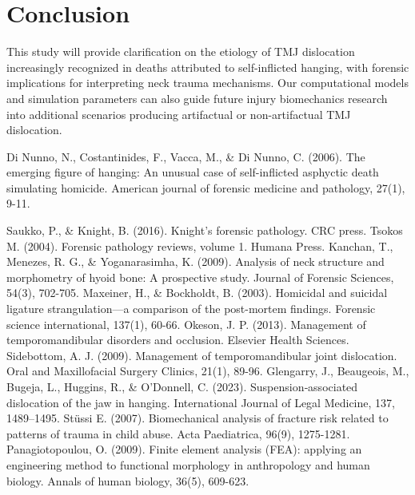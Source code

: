 \documentclass{article}
\begin{document}

\section{Conclusion}
This study will provide clarification on the etiology of TMJ dislocation increasingly recognized in deaths attributed to self-inflicted hanging, with forensic implications for interpreting neck trauma mechanisms. Our computational models and simulation parameters can also guide future injury biomechanics research into additional scenarios producing artifactual or non-artifactual TMJ dislocation.


\clearpage


%

\begin{thebibliography}{10}
Di Nunno, N., Costantinides, F., Vacca, M., \& Di Nunno, C. (2006). The emerging figure of hanging: An unusual case of self-inflicted asphyctic death simulating homicide. American journal of forensic medicine and pathology, 27(1), 9-11.

Saukko, P., \& Knight, B. (2016). Knight's forensic pathology. CRC press.
Tsokos M. (2004). Forensic pathology reviews, volume 1. Humana Press.
Kanchan, T., Menezes, R. G., & Yoganarasimha, K. (2009). Analysis of neck structure and morphometry of hyoid bone: A prospective study. Journal of Forensic Sciences, 54(3), 702-705.
Maxeiner, H., \& Bockholdt, B. (2003). Homicidal and suicidal ligature strangulation—a comparison of the post-mortem findings. Forensic science international, 137(1), 60-66.
Okeson, J. P. (2013). Management of temporomandibular disorders and occlusion. Elsevier Health Sciences.
Sidebottom, A. J. (2009). Management of temporomandibular joint dislocation. Oral and Maxillofacial Surgery Clinics, 21(1), 89-96.
Glengarry, J., Beaugeois, M., Bugeja, L., Huggins, R., \& O’Donnell, C. (2023). Suspension‐associated dislocation of the jaw in hanging. International Journal of Legal Medicine, 137, 1489–1495.
Stüssi E. (2007). Biomechanical analysis of fracture risk related to patterns of trauma in child abuse. Acta Paediatrica, 96(9), 1275-1281.
Panagiotopoulou, O. (2009). Finite element analysis (FEA): applying an engineering method to functional morphology in anthropology and human biology. Annals of human biology, 36(5), 609-623.
\end{thebibliography}


\end{document}
